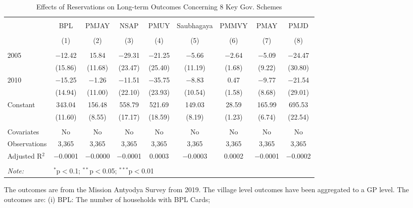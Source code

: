 \begin{table}[!htbp]
\centering
\begin{threeparttable}

  \caption{Effects of Reservations on Long-term Outcomes Concerning 8 Key Gov. Schemes} 
  \label{raj_shrug_schemes_05_10} 
\scriptsize 
\begin{tabular}{@{\extracolsep{0pt}}lcccccccc} 
\\[-1.8ex]\hline 
\hline \\[-1.8ex] 
 & BPL & PMJAY & NSAP & PMUY & Saubhagaya & PMMVY & PMAY & PMJD \\ 
\\[-1.8ex] & (1) & (2) & (3) & (4) & (5) & (6) & (7) & (8)\\ 
\hline \\[-1.8ex] 
 2005 & $-$12.42 & 15.84 & $-$29.31 & $-$21.25 & $-$5.66 & $-$2.64 & $-$5.09 & $-$24.47 \\ 
  & (15.86) & (11.68) & (23.47) & (25.40) & (11.19) & (1.68) & (9.22) & (30.80) \\ 
  2010 & $-$15.25 & $-$1.26 & $-$11.51 & $-$35.75 & $-$8.83 & 0.47 & $-$9.77 & $-$21.54 \\ 
  & (14.94) & (11.00) & (22.10) & (23.93) & (10.54) & (1.58) & (8.68) & (29.01) \\ 
  Constant & 343.04 & 156.48 & 558.79 & 521.69 & 149.03 & 28.59 & 165.99 & 695.53 \\ 
  & (11.60) & (8.55) & (17.17) & (18.59) & (8.19) & (1.23) & (6.74) & (22.54) \\ 
 \hline \\[-1.8ex] 
Covariates & No & No & No & No & No & No & No & No \\ 
Observations & 3,365 & 3,365 & 3,365 & 3,365 & 3,365 & 3,365 & 3,365 & 3,365 \\ 
Adjusted R$^{2}$ & $-$0.0001 & $-$0.0000 & $-$0.0001 & 0.0003 & $-$0.0003 & 0.0002 & $-$0.0001 & $-$0.0002 \\ 
\hline 
\hline \\[-1.8ex] 
\textit{Note:}  & \multicolumn{8}{l}{$^{*}$p$<$0.1; $^{**}$p$<$0.05; $^{***}$p$<$0.01} \\ 
\end{tabular} 
\begin{tablenotes}[flushleft]
\scriptsize
\item The outcomes are from the Mission Antyodya Survey from 2019. 
                   The village level outcomes have been aggregated to a GP level. The outcomes are:
                   (i) BPL: The number of households with BPL Cards;

\end{tablenotes}
\end{threeparttable}
\end{table}
